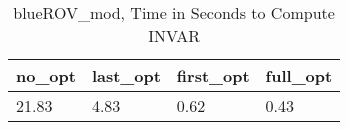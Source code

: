 \begin{table}
\caption{blueROV\_mod, Time in Seconds to Compute INVAR}
\label{blueROV_mod_INVAR_time}
\begin{tabular}{llll}
\toprule
no\_opt & last\_opt & first\_opt & full\_opt \\
\midrule
21.83 & 4.83 & 0.62 & 0.43 \\
\bottomrule
\end{tabular}
\end{table}
